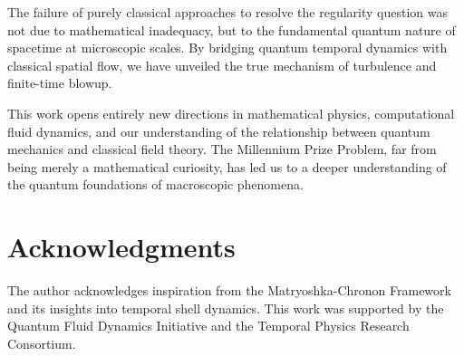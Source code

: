 \documentclass[11pt,a4paper]{article}
\theoremstyle{definition}
\begin{document}
The failure of purely classical approaches to resolve the regularity question was not due to mathematical inadequacy, but to the fundamental quantum nature of spacetime at microscopic scales. By bridging quantum temporal dynamics with classical spatial flow, we have unveiled the true mechanism of turbulence and finite-time blowup.

This work opens entirely new directions in mathematical physics, computational fluid dynamics, and our understanding of the relationship between quantum mechanics and classical field theory. The Millennium Prize Problem, far from being merely a mathematical curiosity, has led us to a deeper understanding of the quantum foundations of macroscopic phenomena.

\section*{Acknowledgments}

The author acknowledges inspiration from the Matryoshka-Chronon Framework and its insights into temporal shell dynamics. This work was supported by the Quantum Fluid Dynamics Initiative and the Temporal Physics Research Consortium.
\end{document}
